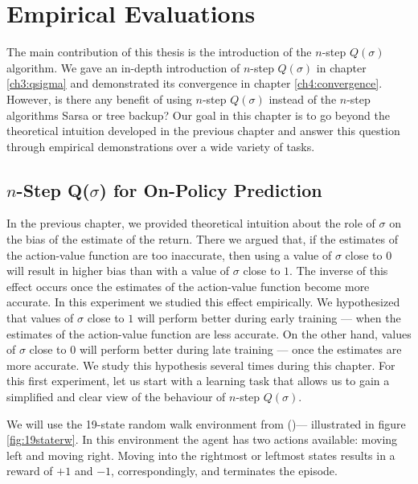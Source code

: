 \providecommand{\main}{..}


\chapter{Empirical Evaluations}
\label{ch5:empirical_evaluation}

The main contribution of this thesis is the introduction of the $n$-step $Q(\sigma)$ algorithm.
We gave an in-depth introduction of $n$-step $Q(\sigma)$ in chapter \ref{ch3:qsigma} and demonstrated its convergence in chapter \ref{ch4:convergence}.
However, is there any benefit of using $n$-step $Q(\sigma)$ instead of the $n$-step algorithms Sarsa or tree backup?
Our goal in this chapter is to go beyond the theoretical intuition developed in the previous chapter and answer this question through empirical demonstrations over a wide variety of tasks.

\section{$n$-Step Q($\sigma$) for On-Policy Prediction}

In the previous chapter, we provided theoretical intuition about the role of $\sigma$ on the bias of the estimate of the return.
There we argued that, if the estimates of the action-value function are too inaccurate, then using a value of $\sigma$ close to $0$ will result in higher bias than with a value of $\sigma$ close to $1$.
The inverse of this effect occurs once the estimates of the action-value function become more accurate.
In this experiment we studied this effect empirically.
We hypothesized that values of $\sigma$ close to $1$ will perform better during early training --- when the estimates of the action-value function are less accurate.
On the other hand, values of $\sigma$ close to $0$ will perform better during late training --- once the estimates are more accurate.
We study this hypothesis several times during this chapter.
For this first experiment, let us start with a learning task that allows us to gain a simplified and clear view of the behaviour of $n$-step $Q(\sigma)$.

We will use the 19-state random walk environment from \citeauthor{Sutton:1998:IRL:551283} (\citeyear{Sutton:1998:IRL:551283})--- illustrated in figure \ref{fig:19staterw}.
In this environment the agent has two actions available: moving left and moving right.
Moving into the rightmost or leftmost states results in a reward of $+1$ and $-1$, correspondingly, and terminates the episode.

